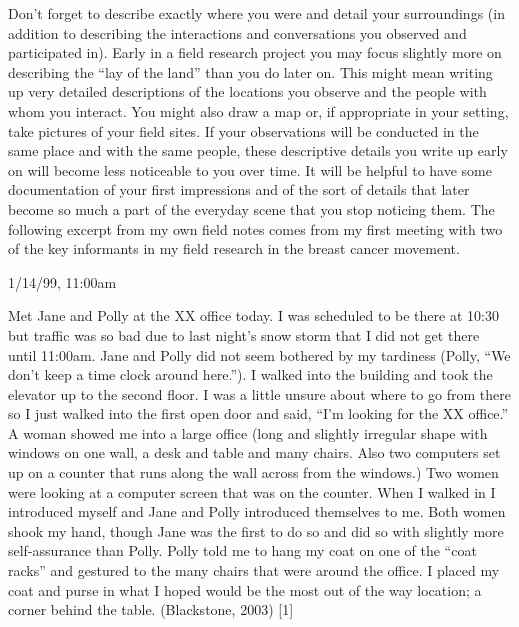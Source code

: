 Don’t forget to describe exactly where you were and detail your surroundings (in addition to describing the interactions and conversations you observed and participated in). Early in a field research project you may focus slightly more on describing the ``lay of the land'' than you do later on. This might mean writing up very detailed descriptions of the locations you observe and the people with whom you interact. You might also draw a map or, if appropriate in your setting, take pictures of your field sites. If your observations will be conducted in the same place and with the same people, these descriptive details you write up early on will become less noticeable to you over time. It will be helpful to have some documentation of your first impressions and of the sort of details that later become so much a part of the everyday scene that you stop noticing them. The following excerpt from my own field notes comes from my first meeting with two of the key informants in my field research in the breast cancer movement.

1/14/99, 11:00am

Met Jane and Polly at the XX office today. I was scheduled to be there at 10:30 but traffic was so bad due to last night’s snow storm that I did not get there until 11:00am. Jane and Polly did not seem bothered by my tardiness (Polly, ``We don’t keep a time clock around here.''). I walked into the building and took the elevator up to the second floor. I was a little unsure about where to go from there so I just walked into the first open door and said, ``I’m looking for the XX office.'' A woman showed me into a large office (long and slightly irregular shape with windows on one wall, a desk and table and many chairs. Also two computers set up on a counter that runs along the wall across from the windows.) Two women were looking at a computer screen that was on the counter. When I walked in I introduced myself and Jane and Polly introduced themselves to me. Both women shook my hand, though Jane was the first to do so and did so with slightly more self-assurance than Polly. Polly told me to hang my coat on one of the ``coat racks'' and gestured to the many chairs that were around the office. I placed my coat and purse in what I hoped would be the most out of the way location; a corner behind the table. (Blackstone, 2003) [1]


